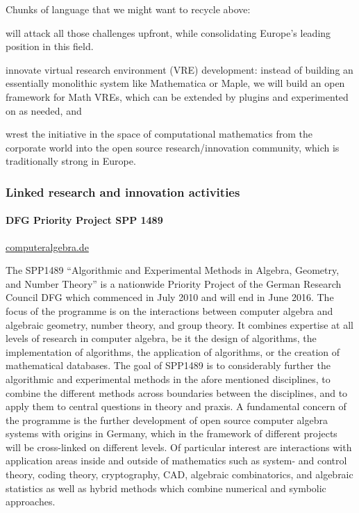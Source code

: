   Chunks of language that we might want to recycle above:
  \begin{compactenum}[\em i)\rm]
  \item \TheProject will attack all those challenges upfront, while
    consolidating Europe's leading position in this field.
  \item innovate virtual research environment (VRE) development:
    instead of building an essentially monolithic system like
    Mathematica or Maple, we will build an open framework for Math
    VREs, which can be extended by plugins and experimented on as
    needed, and
  \item wrest the initiative in the space of computational mathematics
    from the corporate world into the open source research/innovation
    community, which is traditionally strong in Europe.
\end{compactenum}

\subsubsection{Linked research and innovation activities}\label{linked-projects}



\paragraph{DFG Priority Project SPP 1489}
\url{computeralgebra.de}

The SPP1489 ``Algorithmic and Experimental Methods in Algebra, Geometry, and
Number Theory'' is a nationwide Priority Project of the German Research Council DFG  
which commenced in July  2010 and will end in June 2016. The focus of the programme 
is on the interactions between computer algebra and algebraic geometry, number theory, 
and group theory. It combines expertise at all levels of research in computer algebra, 
be it the design of algorithms, the implementation of algorithms, the application
of algorithms, or the creation of mathematical databases. The goal of SPP1489 is to 
considerably further the algorithmic and experimental methods in the afore mentioned
disciplines, to combine the different methods across boundaries between the disciplines, 
and to apply them to central questions in theory and praxis. A fundamental concern of the
programme is the further development of open source
computer algebra systems with origins in Germany, which in
the framework of different projects will be cross-linked on
different levels. Of particular interest are interactions with application areas inside
and outside of mathematics such as system- and control theory, coding
theory, cryptography, CAD, algebraic combinatorics, and algebraic
statistics as well as hybrid methods which combine numerical and
symbolic approaches. 

